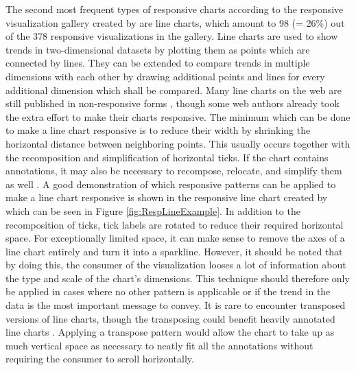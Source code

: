 The second most frequent types of responsive charts according to the responsive visualization gallery created by \cite{DesignPatternsTradeOffsRespVis} are line charts, which amount to 98 (= 26\%) out of the 378 responsive visualizations in the gallery.
Line charts are used to show trends in two-dimensional datasets by plotting them as points which are connected by lines.
They can be extended to compare trends in multiple dimensions with each other by drawing additional points and lines for every additional dimension which shall be compared.
Many line charts on the web are still published in non-responsive forms \parencite{HLine,HLine2}, though some web authors already took the extra effort to make their charts responsive.
The minimum which can be done to make a line chart responsive is to reduce their width \parencite{RespRadialScatterHLine} by shrinking the horizontal distance between neighboring points.
This usually occurs together with the recomposition and simplification of horizontal ticks.
If the chart contains annotations, it may also be necessary to recompose, relocate, and simplify them as well \parencite{RespHLines,RespHLine,RespHBarHLine,RespHLineHStackedBar}.
A good demonstration of which responsive patterns can be applied to make a line chart responsive is shown in the responsive line chart created by \cite{RespVis} which can be seen in Figure \ref{fig:RespLineExample}.
In addition to the recomposition of ticks, tick labels are rotated to reduce their required horizontal space.
For exceptionally limited space, it can make sense to remove the axes of a line chart entirely and turn it into a sparkline.
However, it should be noted that by doing this, the consumer of the visualization looses a lot of information about the type and scale of the chart's dimensions.
This technique should therefore only be applied in cases where no other pattern is applicable or if the trend in the data is the most important message to convey.
It is rare to encounter transposed versions of line charts, though the transposing could benefit heavily annotated line charts \parencite{VLine}.
Applying a transpose pattern would allow the chart to take up as much vertical space as necessary to neatly fit all the annotations without requiring the consumer to scroll horizontally.

